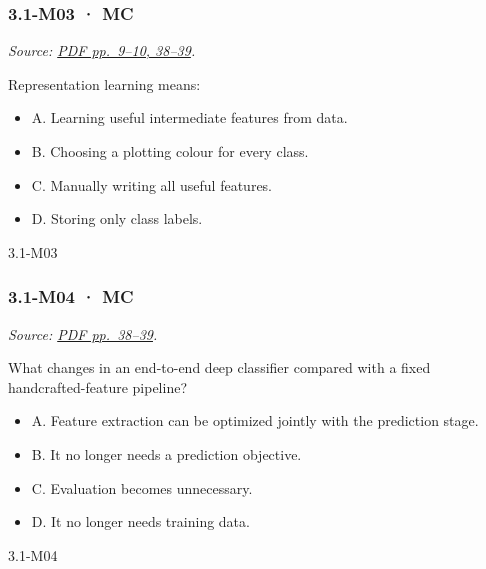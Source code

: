 \noindent\begin{minipage}{\linewidth}

\subsubsection{3.1-M03 · MC}\label{m03-mc-7}

\emph{Source:
\href{../Lecture\%20Slides/3.1.\%20Introduction\%20to\%20Deep\%20Learning.pdf\#page=9}{PDF
pp.~9--10, 38--39}.}

Representation learning means:

\begin{itemize}
\tightlist
\item
  A. Learning useful intermediate features from data.
\item
  B. Choosing a plotting colour for every class.
\item
  C. Manually writing all useful features.
\item
  D. Storing only class labels.
\end{itemize}

\begin{solution}[8mm]{3.1-M03}

\end{solution}
\end{minipage}\par\medskip

\noindent\begin{minipage}{\linewidth}

\subsubsection{3.1-M04 · MC}\label{m04-mc-7}

\emph{Source:
\href{../Lecture\%20Slides/3.1.\%20Introduction\%20to\%20Deep\%20Learning.pdf\#page=38}{PDF
pp.~38--39}.}

What changes in an end-to-end deep classifier compared with a fixed
handcrafted-feature pipeline?

\begin{itemize}
\tightlist
\item
  A. Feature extraction can be optimized jointly with the prediction
  stage.
\item
  B. It no longer needs a prediction objective.
\item
  C. Evaluation becomes unnecessary.
\item
  D. It no longer needs training data.
\end{itemize}

\begin{solution}[8mm]{3.1-M04}

\end{solution}
\end{minipage}\par\medskip

